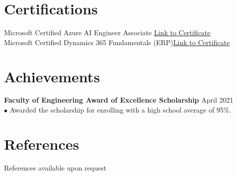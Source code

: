 \documentclass[letterpaper,12pt]{article}
\begin{document}
\section{Certifications}
Microsoft Certified Azure AI Engineer Associate \hfill \href{https://learn.microsoft.com/en-us/users/zichengli-4388/credentials/8f80de9e7944a10}{Link to Certificate}\\
Microsoft Certified Dynamics 365 Fundamentals (ERP)\hfill \href{https://learn.microsoft.com/en-us/users/zichengli-4388/credentials/5d28421aefedb4ec}{Link to Certificate}
\section{Achievements}
\textbf{Faculty of Engineering Award of Excellence Scholarship}  \hfill  \normalsize{April 2021} \\
$\bullet$ \hspace{1em}Awarded the scholarship for enrolling with a high school average of 95\%.
\section{References}
References available upon request
\end{document}
